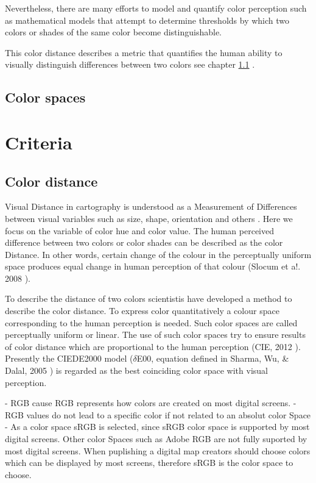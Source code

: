 Nevertheless, there are many efforts to model and quantify color perception such as mathematical models that attempt to determine thresholds by which two colors or shades of the same color become distinguishable. 

This color distance describes a metric that quantifies the human ability to visually distinguish differences between two colors see chapter \ref{subsection:distance} \parencite{coltekin2017}.

\subsection{Color spaces}

\section{Criteria}

\subsection{Color distance}\label{subsection:distance}
Visual Distance in cartography is understood as a Measurement of Differences between visual variables such as size, shape, orientation and others \parencite{brychtova2015}. Here we focus on the variable of color hue and color value. The human perceived difference between two colors or color shades can be described as the color Distance. In other words, certain change of the colour in the perceptually uniform space produces equal change in human perception of that colour (Slocum et a!. 2008 \parencite{brychtova2017}).

To describe the distance of two colors scientistis have developed a method to describe the color distance. To express color quantitatively a colour space corresponding to the human perception is needed. Such color spaces are called perceptually uniform or linear. The use of such color spaces try to ensure results of color distance which are proportional to the human perception (CIE, 2012 \parencite{brychtova2015}). Presently the CIEDE2000 model ($\delta$E00, equation defined in Sharma, Wu, \& Dalal, 2005 \parencite{brychtova2015}) is regarded as the best coinciding color space with visual perception. 
 
- RGB cause RGB represents how colors are created on most digital screens. 
- RGB values do not lead to a specific color if not related to an absolut color Space
- As a color space sRGB is selected, since sRGB color space is supported by most digital screens. Other color Spaces such as Adobe RGB are not fully suported by most digital screens. When puplishing a digital map creators should choose colors which can be displayed by most screens, therefore sRGB is the color space to choose.
